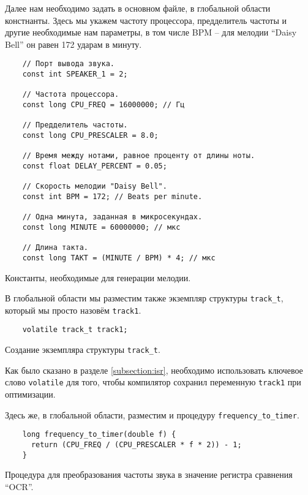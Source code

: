\documentclass[../sparc.tex]{subfiles}
\begin{document}
\newpage
Далее нам необходимо задать в основном файле, в глобальной области констнанты.
Здесь мы укажем частоту процессора, предделитель частоты и другие необходимые
нам параметры, в том числе \gls{BPM} -- для мелодии ``Daisy Bell'' он равен 172
ударам в минуту.

\begin{listing}[H]
  \begin{verbatim}
    // Порт вывода звука.
    const int SPEAKER_1 = 2;

    // Частота процессора.
    const long CPU_FREQ = 16000000; // Гц

    // Предделитель частоты.
    const long CPU_PRESCALER = 8.0;

    // Время между нотами, равное проценту от длины ноты.
    const float DELAY_PERCENT = 0.05;

    // Скорость мелодии "Daisy Bell".
    const int BPM = 172; // Beats per minute.

    // Одна минута, заданная в микросекундах.
    const long MINUTE = 60000000; // мкс

    // Длина такта.
    const long TAKT = (MINUTE / BPM) * 4; // мкс
  \end{verbatim}
  \caption{Константы, необходимые для генерации мелодии.}
  \label{listing:mcu-music-4}
\end{listing}

В глобальной области мы разместим также экземпляр структуры
\texttt{track_t}, который мы просто назовём \texttt{track1}.

\begin{listing}[H]
  \begin{verbatim}
    volatile track_t track1;
  \end{verbatim}
  \caption{Создание экземпляра структуры \texttt{track_t}.}
  \label{listing:mcu-music-5}
\end{listing}

Как было сказано в разделе \ref{subsection:isr}, необходимо использовать
ключевое слово \texttt{volatile} для того, чтобы компилятор сохранил
переменную \texttt{track1} при оптимизации.

Здесь же, в глобальной области, разместим и процедуру
\texttt{frequency_to_timer}.

\begin{listing}[H]
  \begin{verbatim}
    long frequency_to_timer(double f) {
      return (CPU_FREQ / (CPU_PRESCALER * f * 2)) - 1;
    }
  \end{verbatim}
  \caption{Процедура для преобразования частоты звука в значение регистра
    сравнения ``OCR''.}
  \label{listing:mcu-music-6}
\end{listing}
\end{document}
